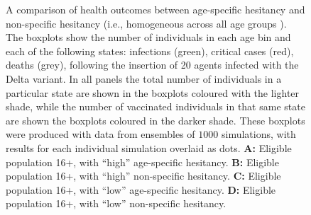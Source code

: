 \documentclass[article, a4, authoryear]{elsarticle}
\begin{document}

\begin{figure}[]
\centering
{}
\hfill
{}
\hfill
{}
\hfill
{}
\caption{A comparison of health outcomes between age-specific hesitancy and non-specific hesitancy (i.e., homogeneous across all age groups ). The boxplots show the number of individuals in each age bin and each of the following states: infections (green), critical cases (red), deaths (grey), following the insertion of 20 agents infected with the Delta variant. In all panels the total number of individuals in a particular state are shown in the boxplots coloured with the lighter shade, while 
the number of vaccinated individuals in that same state are shown the boxplots coloured in the darker shade. These boxplots were produced with data from ensembles of $1000$ simulations, with results for each individual simulation overlaid as dots. \textbf{A:} Eligible population 16+, with ``high'' age-specific hesitancy. \textbf{B:} Eligible population 16+, with ``high'' non-specific hesitancy. \textbf{C:} Eligible population 16+, with ``low'' age-specific hesitancy. \textbf{D:} Eligible population 16+, with ``low'' non-specific hesitancy.  } 
\label{sfig:FiguresCompare_AgeSpec}
\end{figure}
\end{document}
